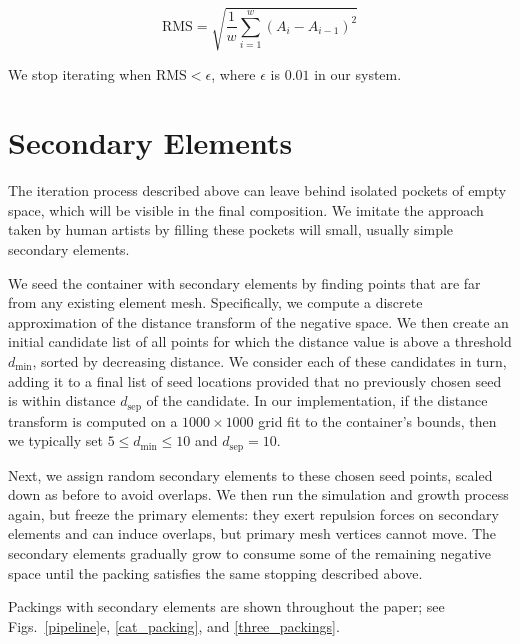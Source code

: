 \begin{equation}
\mathrm{RMS} = \sqrt{ \frac{1}{w}\sum_{ i = 1 }^{w} { (A_i - A_{i-1}) }^2}
\end{equation}

We stop iterating when $\mathrm{RMS} < \epsilon$, where $\epsilon$ is $0.01$
in our system.

\section{Secondary Elements}
\label{repulsionpak_secondary_elements}

The iteration process described above can leave behind isolated pockets of 
empty space, which will be visible in the final composition.  We imitate the
approach taken by human artists by filling these pockets will small, usually
simple secondary elements.  

We seed the container with secondary elements by finding points
that are far from any existing element mesh.  Specifically, we
compute a discrete approximation of the distance transform of the
negative space. We then create an initial candidate list of all
points for which the distance value is above a threshold $d_\mathrm{min}$, sorted
by decreasing distance.  We consider each of these candidates in turn,
adding it to a final list of seed locations provided that no previously
chosen seed is within distance $d_\mathrm{sep}$ of the candidate.
In our implementation, if the distance transform is computed on a 
$1000\times 1000$ grid fit to the container's bounds, then we typically 
set $5 \leq d_\mathrm{min} \leq 10$ and $d_\mathrm{sep}=10$. 

Next, we assign random secondary elements to these chosen seed
points, scaled down as before to avoid overlaps.  We then run the
simulation and growth process again, but freeze the primary elements:
they exert repulsion forces on secondary elements and can induce
overlaps, but primary mesh vertices cannot move.  The secondary
elements gradually grow to consume some of the remaining negative
space until the packing satisfies the same stopping 
described above.

Packings with secondary elements are shown throughout the paper; 
see Figs.~\ref{pipeline}e, \ref{cat_packing}, and \ref{three_packings}.


